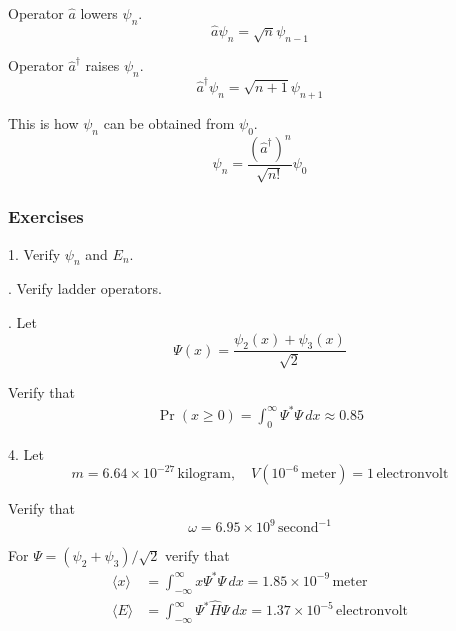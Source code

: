 Operator $\hat a$ lowers $\psi_n$.
\begin{equation*}
\hat a\psi_n=\sqrt n\psi_{n-1}
\end{equation*}

Operator $\hat a^\dag$ raises $\psi_n$.
\begin{equation*}
\hat a^\dag\psi_n=\sqrt{n+1}\psi_{n+1}
\end{equation*}

This is how $\psi_n$ can be obtained from $\psi_0$.
\begin{equation*}
\psi_n=\frac{(\hat a^\dag)^n}{\sqrt{n!}}\psi_0
\end{equation*}

\subsubsection*{Exercises}

1. Verify $\psi_n$ and $E_n$.

. Verify ladder operators.

. Let
\begin{equation*}
\Psi(x)=\frac{\psi_2(x)+\psi_3(x)}{\sqrt2}
\end{equation*}

Verify that
\begin{align*}
\Pr(x\ge0)=\int_0^\infty \Psi^*\Psi\,dx\approx0.85
\end{align*}

4. Let
\begin{equation*}
m=6.64\times10^{-27}\,\text{kilogram},\quad
V(10^{-6}\,\text{meter})=1\,\text{electronvolt}
\end{equation*}

Verify that
\begin{equation*}
\omega=6.95\times10^9\,\text{second}^{-1}
\end{equation*}

For $\Psi=(\psi_2+\psi_3)/\sqrt2$ verify that
\begin{align*}
\langle x\rangle&=\int_{-\infty}^\infty x\Psi^*\Psi\,dx=1.85\times10^{-9}\,\text{meter}
\\
\langle E\rangle&=\int_{-\infty}^\infty \Psi^*\hat H\Psi\,dx=1.37\times10^{-5}\,\text{electronvolt}
\end{align*}


